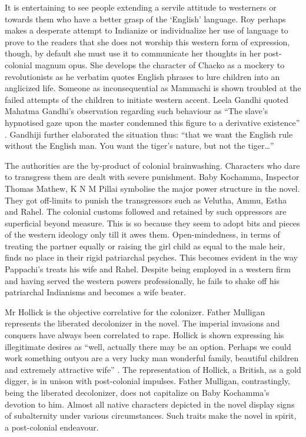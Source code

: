 It is entertaining to see people extending a servile attitude to westerners or towards them who have a better grasp of the `English' language. Roy perhaps makes a desperate attempt to Indianize or individualize her use of language to prove to the readers that she does not worship this western form of expression, though, by default she must use it to communicate her thoughts in her post-colonial magnum opus. She develops the character of Chacko as a mockery to revolutionists as he verbatim quotes English phrases to lure children into an anglicized life.  Someone as inconsequential as Mammachi is shown troubled at the failed attempts of the children to initiate western accent. Leela Gandhi quoted Mahatma Gandhi's observation regarding such behaviour as ``The slave's hypnotised gaze upon the master condemned this figure to a derivative existence'' \parencite[21]{Gandhi1998}. Gandhiji further elaborated the situation thus: ``that we want the English rule without the English man. You want the tiger's nature, but not the tiger\ldots'' \parencite[30]{Gandhi1998}

The authorities are the by-product of colonial brainwashing. Characters who dare to transgress them are dealt with severe punishment. Baby Kochamma, Inspector Thomas Mathew, K N M Pillai symbolise the major power structure in the novel. They got off-limits to punish the transgressors such as Velutha, Ammu, Estha and Rahel. The colonial customs followed and retained by such oppressors are superficial beyond measure. This is so because they seem to adopt bits and pieces of the western ideology only till it awes them. Open-mindedness, in terms of treating the partner equally or raising the girl child as equal to the male heir, finds no place in their rigid patriarchal psyches. This becomes evident in the way Pappachi's treats his wife and Rahel. Despite being employed in a western firm and having served the western powers professionally, he fails to shake off his patriarchal Indianisms and becomes a wife beater. 

Mr Hollick is the objective correlative for the colonizer. Father Mulligan represents the liberated decolonizer in the novel. The imperial invasions and conquers have always been correlated to rape. Hollick is shown expressing his illegitimate desires as ``well, actually there may be an option. Perhaps we could work something outyou are a very lucky man wonderful family, beautiful children and extremely attractive wife'' \parencite[41]{Roy1997}. The representation of Hollick, a British, as a gold digger, is in unison with post-colonial impulses. Father Mulligan, contrastingly, being the liberated decolonizer, does not capitalize on Baby Kochamma's devotion to him. Almost all native characters depicted in the novel display signs of subalternity under various circumstances. Such traits make the novel in spirit, a post-colonial endeavour. 

